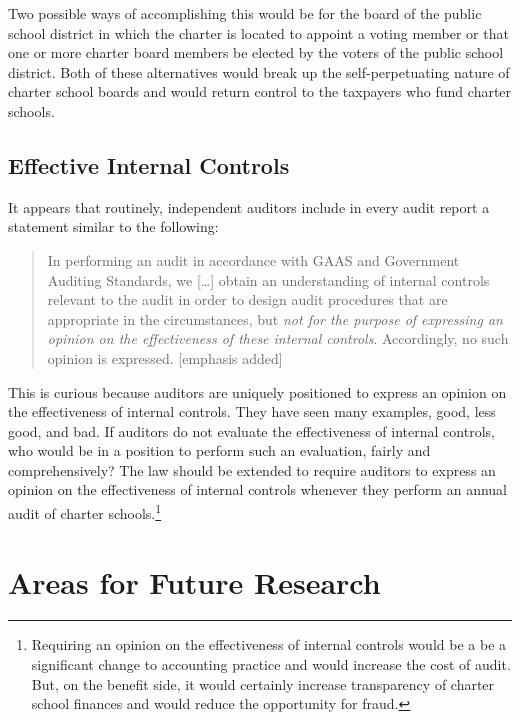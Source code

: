 Two possible ways of accomplishing this would be for the board of the public school district in which the charter is located to appoint a voting member or that one or more charter board members be elected by the voters of the public school district. Both of these alternatives would break up the self-perpetuating nature of charter school boards and would return control to the taxpayers who fund charter schools.

\subsection{Effective Internal Controls}%
\label{sec:effect-intern-contr}%

It appears that routinely, independent auditors include in every audit report a statement similar to the following:
\blockquote{In performing an audit in accordance with GAAS and Government Auditing Standards, we [\ldots]
  obtain an understanding of internal controls relevant to the audit in order to design audit procedures that are appropriate in the circumstances, but \textit{not for the purpose of expressing an opinion on the effectiveness of these internal controls}. Accordingly, no such opinion is expressed. [emphasis added]}

This is curious because auditors are uniquely positioned to express an opinion on the effectiveness of internal controls. They have seen many examples, good, less good, and bad. If auditors do not evaluate the effectiveness of internal controls, who would be in a position to perform such an evaluation, fairly and comprehensively? The law should be extended to require auditors to express an opinion on the effectiveness of internal controls whenever they perform an annual audit of charter schools.\footnote{Requiring an opinion on the effectiveness of internal controls would be a be a significant change to accounting practice and would increase the cost of audit. But, on the benefit side, it would certainly increase transparency of charter school finances and would reduce the opportunity for fraud.}

\section{Areas for Future Research}%
\label{sec:areas-future-rese}%

